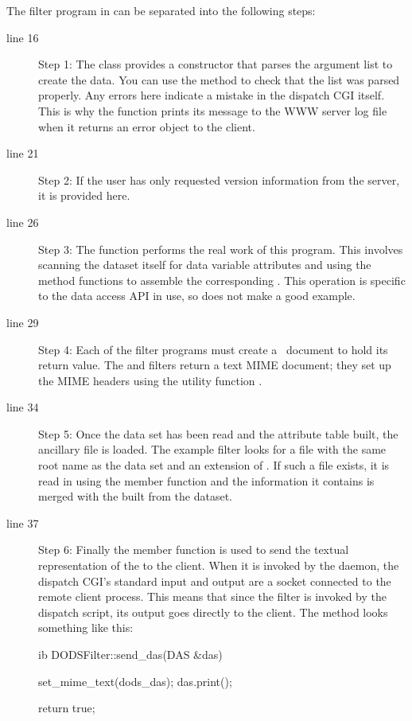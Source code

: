 The filter program in  can be separated into
the following steps:

\begin{description}
  
\item[line 16] Step 1: The  class provides a
  constructor that parses the argument list to create the data.  You
  can use the  method to check that the list was parsed
  properly.  Any errors here indicate a mistake in the dispatch CGI
  itself.  This is why the  function prints its
  message to the WWW server log file when it returns an error object
  to the client.
  
\item[line 21] Step 2: If the user has only requested version
  information from the server, it is provided here.
  
\item[line 26] Step 3: The  function performs the
  real work of this program.  This involves scanning the dataset
  itself for data variable attributes and using the  method
  functions to assemble the corresponding .  This operation
  is specific to the data access API in use, so does not make a good
  example.
  
\item[line 29] Step 4: Each of the filter programs must create a
  \MIME\ document to hold its return value. The  and
   filters return a text MIME document; they set up the
  MIME headers using the utility function .
  
\item[line 34] Step 5: Once the data set has been read and the
  attribute table built, the  ancillary file is loaded. The
  example filter looks for a file with the same root name as the data
  set and an extension of . If such a file exists, it is
  read in using the  member function  and
  the information it contains is merged with the  built
  from the dataset.
  
\item[line 37] Step 6: Finally the  member function
   is used to send the textual representation of the
   to the client.  When it is invoked by the 
  daemon, the dispatch CGI's standard input and output are a socket
  connected to the remote client process.  This means that since the
  filter is invoked by the dispatch script, its output goes directly
  to the client.  The   method looks
  something like this:

\begin{vcode}{ib}
DODSFilter::send_das(DAS &das)
{
    set_mime_text(dods_das);
    das.print();

    return true;
}
\end{vcode}

\end{description}

